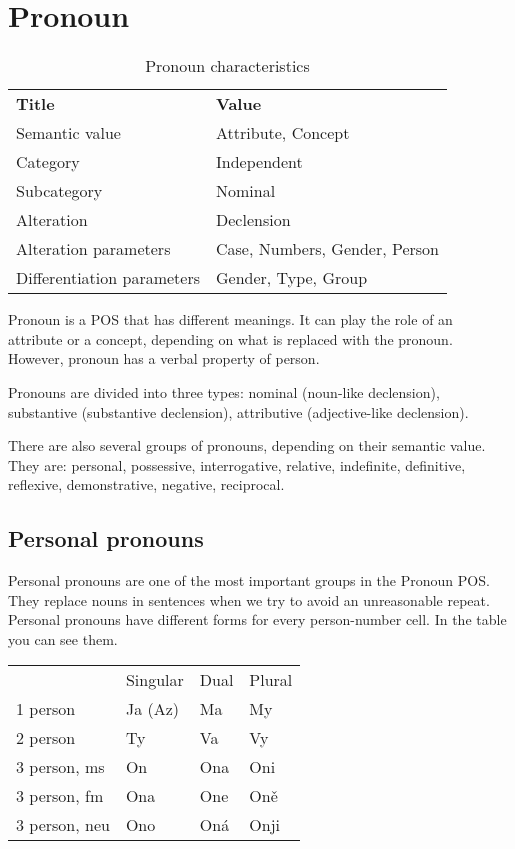 \section{Pronoun}

\begin{table}[!hbt]
	\caption{Pronoun characteristics}
	\begin{tabular}{lp{12em}}
		\textbf{Title}              & \textbf{Value}               \\
		Semantic value              & Attribute, Concept           \\
		Category                    & Independent                  \\
		Subcategory                 & Nominal                      \\
		Alteration                  & Declension                   \\
		Alteration parameters       & Case, Numbers, Gender, Person\\
		Differentiation parameters  & Gender, Type, Group
	\end{tabular}
\end{table}

Pronoun is a POS that has different meanings. It can play the role of an attribute or a concept, depending on what is replaced with the pronoun. However, pronoun has a verbal property of person.

Pronouns are divided into three types: nominal (noun-like declension), substantive (substantive declension), attributive (adjective-like declension).

There are also several groups of pronouns, depending on their semantic value. They are: personal, possessive, interrogative, relative, indefinite, definitive, reflexive, demonstrative, negative, reciprocal.

\subsection{Personal pronouns}

Personal pronouns are one of the most important groups in the Pronoun POS. They replace nouns in sentences when we try to avoid an unreasonable repeat. Personal pronouns have different forms for every person-number cell. In the table you can see them.

\begin{table}[!htb]
	\begin{tabular}{llll}
		& Singular & Dual & Plural \\
		1 person & Ja (Az) & Ma & My \\
		2 person & Ty & Va & Vy \\
		3 person, ms & On & Ona & Oni \\
		3 person, fm & Ona & One & Oně \\
		3 person, neu & Ono & Oná & Onji
	\end{tabular}
\end{table}

